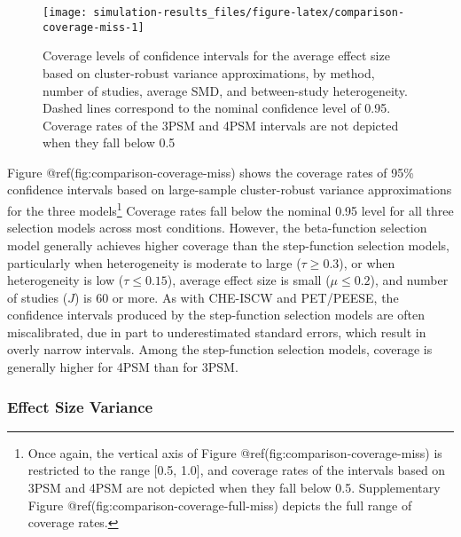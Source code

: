\documentclass[
]{article}
\begin{document}
\begin{sidewaysfigure}
\texttt{[image: simulation-results\_files/figure-latex/comparison-coverage-miss-1]} \caption{Coverage levels of confidence intervals for the average effect size based on cluster-robust variance approximations, by method, number of studies, average SMD, and between-study heterogeneity. Dashed lines correspond to the nominal confidence level of 0.95. Coverage rates of the 3PSM and 4PSM intervals are not depicted when they fall below 0.5}\label{fig:comparison-coverage-miss}
\end{sidewaysfigure}

Figure @ref(fig:comparison-coverage-miss) shows the coverage rates of
95\% confidence intervals based on large-sample cluster-robust variance
approximations for the three models\footnote{Once again, the vertical
  axis of Figure @ref(fig:comparison-coverage-miss) is restricted to the
  range {[}0.5, 1.0{]}, and coverage rates of the intervals based on
  3PSM and 4PSM are not depicted when they fall below 0.5. Supplementary
  Figure @ref(fig:comparison-coverage-full-miss) depicts the full range
  of coverage rates.} Coverage rates fall below the nominal 0.95 level
for all three selection models across most conditions. However, the
beta-function selection model generally achieves higher coverage than
the step-function selection models, particularly when heterogeneity is
moderate to large (\(\tau \geq 0.3\)), or when heterogeneity is low
(\(\tau \leq 0.15\)), average effect size is small (\(\mu \leq 0.2\)),
and number of studies (\(J\)) is 60 or more. As with CHE-ISCW and
PET/PEESE, the confidence intervals produced by the step-function
selection models are often miscalibrated, due in part to underestimated
standard errors, which result in overly narrow intervals. Among the
step-function selection models, coverage is generally higher for 4PSM
than for 3PSM.

\subsubsection{Effect Size Variance}\label{effect-size-variance}
\end{document}
